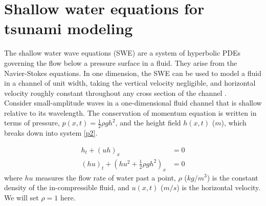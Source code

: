 \documentclass[12pt,a4paper]{article}
\newcommand{\donna}[1]{{\color{red}{#1}}}
\begin{document}
	\section{Shallow water equations for tsunami modeling}
	\donna{Discuss why this is a good model (ocean is very shallow compared to wave length.)  Then introduce shallow water wave equations, the Riemann Problem for SWE, finite volume methods, including handling bathymetry.  Reference papers that use this model (basically most of the papers you have read)}
	

	The shallow water wave equations (SWE) are a system of hyperbolic PDEs governing the flow below a pressure surface in a fluid. They arise from the Navier-Stokes equations.  In one dimension, the SWE  can be used to model a fluid in a channel of unit width, taking the vertical velocity negligible, and horizontal velocity roughly constant throughout any cross section of the channel \cite{ge:2008}.  \\
	
	Consider small-amplitude waves in a one-dimensional fluid channel that is shallow relative to its wavelength. The conservation of momentum equation is written in terms of pressure, $p(x,t) = \frac{1}{2}\rho gh^{2}$, and the height field $h(x,t)$ ($m$), which breaks down into system \eqref{p2}.
	
	\begin{equation}
		\begin{aligned}
			h_{t} + (uh)_x &= 0 \\
			(hu)_t + \left(hu^{2} + \frac{1}{2}\rho gh^{2} \right)_x & = 0 
		\end{aligned}
		\label{p2}
	\end{equation}	
	where $hu$ measures the flow rate of water past a point,  $\rho$ ($kg/m^3$) is the constant density of the in-compressible fluid, and $u(x,t)$ ($m/s$) is the horizontal velocity.  We will set $\rho = 1$ here.\\
	
\end{document}
